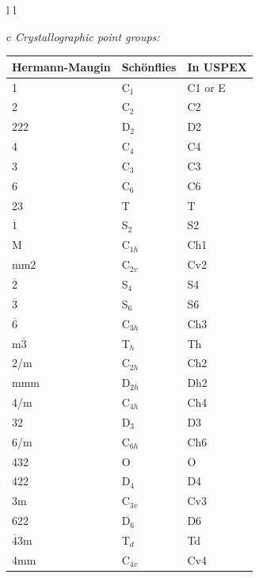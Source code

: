 \documentclass[12pt]{article}
\begin{document}
\begin{tabular}{ l l }

\begin{tabular}{c}
\emph{Crystallographic point groups:} \\

{\footnotesize
\begin{tabular}{|l|l|l|}
\hline
Hermann-Maugin   & Sch\"onflies & In USPEX \\
\hline
1                & C$_1$        & C1 or E  \\
2                & C$_2$        & C2       \\
222              & D$_2$        & D2       \\
4                & C$_4$        & C4       \\
3                & C$_3$        & C3       \\
6                & C$_6$        & C6       \\
23               & T            & T        \\
$\overline{1}$   & S$_2$        & S2       \\
M                & C$_{1h}$     & Ch1      \\
mm2              & C$_{2v}$     & Cv2      \\
$\overline{2}$   & S$_4$        & S4       \\
$\overline{3}$   & S$_6$        & S6       \\
$\overline{6}$   & C$_{3h}$     & Ch3      \\
m$\overline{3}$  & T$_h$        & Th       \\
2/m              & C$_{2h}$     & Ch2      \\
mmm              & D$_{2h}$     & Dh2      \\
4/m              & C$_{4h}$     & Ch4      \\
32               & D$_3$        & D3       \\
6/m              & C$_{6h}$     & Ch6      \\
432              & O            & O        \\
422              & D$_4$        & D4       \\
3m               & C$_{3v}$     & Cv3      \\
622              & D$_6$        & D6       \\
$\overline{4}$3m & T$_d$        & Td       \\
4mm              & C$_{4v}$     & Cv4      \\

\end{tabular}}
\end{tabular}
\end{tabular}
\end{document}
